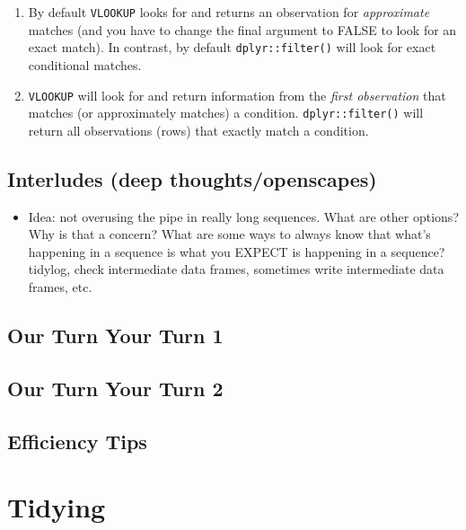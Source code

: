 \documentclass[]{book}
\providecommand{\tightlist}{%
  \setlength{\itemsep}{0pt}\setlength{\parskip}{0pt}}
\begin{document}
\begin{enumerate}
\def\labelenumi{(\arabic{enumi})}
\item
  By default \texttt{VLOOKUP} looks for and returns an observation for \emph{approximate} matches (and you have to change the final argument to FALSE to look for an exact match). In contrast, by default \texttt{dplyr::filter()} will look for exact conditional matches.
\item
  \texttt{VLOOKUP} will look for and return information from the \emph{first observation} that matches (or approximately matches) a condition. \texttt{dplyr::filter()} will return all observations (rows) that exactly match a condition.
\end{enumerate}

\hypertarget{interludes-deep-thoughtsopenscapes-3}{%
\section{Interludes (deep thoughts/openscapes)}\label{interludes-deep-thoughtsopenscapes-3}}

\begin{itemize}
\tightlist
\item
  Idea: not overusing the pipe in really long sequences. What are other options? Why is that a concern? What are some ways to always know that what's happening in a sequence is what you EXPECT is happening in a sequence? tidylog, check intermediate data frames, sometimes write intermediate data frames, etc.
\end{itemize}

\hypertarget{our-turn-your-turn-1-1}{%
\section{Our Turn Your Turn 1}\label{our-turn-your-turn-1-1}}

\hypertarget{our-turn-your-turn-2-1}{%
\section{Our Turn Your Turn 2}\label{our-turn-your-turn-2-1}}

\hypertarget{efficiency-tips-4}{%
\section{Efficiency Tips}\label{efficiency-tips-4}}

\hypertarget{tidying}{%
\chapter{Tidying}\label{tidying}}
\end{document}
